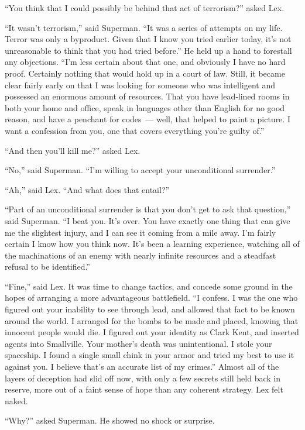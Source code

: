 ``You think that I could possibly be behind that act of terrorism?''
asked Lex.

``It wasn't terrorism,'' said Superman. ``It was a series of attempts on
my life. Terror was only a byproduct. Given that I know you tried
earlier today, it's not unreasonable to think that you had tried
before.'' He held up a hand to forestall any objections. ``I'm less
certain about that one, and obviously I have no hard proof. Certainly
nothing that would hold up in a court of law. Still, it became clear
fairly early on that I was looking for someone who was intelligent and
possessed an enormous amount of resources. That you have lead‐lined
rooms in both your home and office, speak in languages other than
English for no good reason, and have a penchant for codes~--- well, that
helped to paint a picture. I want a confession from you, one that covers
everything you're guilty of.''

``And then you'll kill me?'' asked Lex.

``No,'' said Superman. ``I'm willing to accept your unconditional
surrender.''

``Ah,'' said Lex. ``And what does that entail?''

``Part of an unconditional surrender is that you don't get to ask that
question,'' said Superman. ``I beat you. It's over. You have exactly one
thing that can give me the slightest injury, and I can see it coming
from a mile away. I'm fairly certain I know how you think now. It's been
a learning experience, watching all of the machinations of an enemy with
nearly infinite resources and a steadfast refusal to be identified.''

``Fine,'' said Lex. It was time to change tactics, and concede some
ground in the hopes of arranging a more advantageous battlefield. ``I
confess. I was the one who figured out your inability to see through
lead, and allowed that fact to be known around the world. I arranged for
the bombs to be made and placed, knowing that innocent people would die.
I figured out your identity as Clark Kent, and inserted agents into
Smallville. Your mother's death was unintentional. I stole your
spaceship. I found a single small chink in your armor and tried my best
to use it against you. I believe that's an accurate list of my crimes.''
Almost all of the layers of deception had slid off now, with only a few
secrets still held back in reserve, more out of a faint sense of hope
than any coherent strategy. Lex felt naked.

``Why?'' asked Superman. He showed no shock or surprise.

